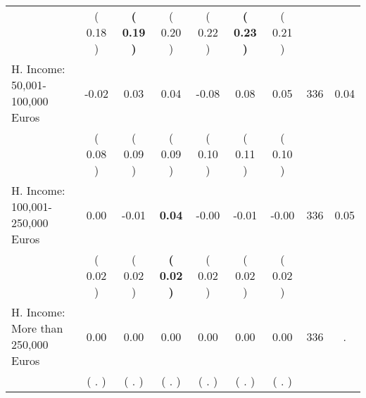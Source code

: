 \begin{tabular}{lcccccccc}
 & (     0.18 ) & \textbf{(     0.19 )} & (     0.20 ) & (     0.22 ) & \textbf{(     0.23 )} & (     0.21 ) & \\
H. Income: 50,001-100,000 Euros &     -0.02 &      0.03 &      0.04 &     -0.08 &      0.08 &      0.05 & 336 &       0.04 \\ 
 & (     0.08 ) & (     0.09 ) & (     0.09 ) & (     0.10 ) & (     0.11 ) & (     0.10 ) & \\
H. Income: 100,001-250,000 Euros &      0.00 &     -0.01 & \textbf{     0.04} &     -0.00 &     -0.01 &     -0.00 & 336 &       0.05 \\ 
 & (     0.02 ) & (     0.02 ) & \textbf{(     0.02 )} & (     0.02 ) & (     0.02 ) & (     0.02 ) & \\
H. Income: More than 250,000 Euros &      0.00 &      0.00 &      0.00 &      0.00 &      0.00 &      0.00 & 336 &          . \\ 
 & (        . ) & (        . ) & (        . ) & (        . ) & (        . ) & (        . ) & \\
\bottomrule
\end{tabular}
